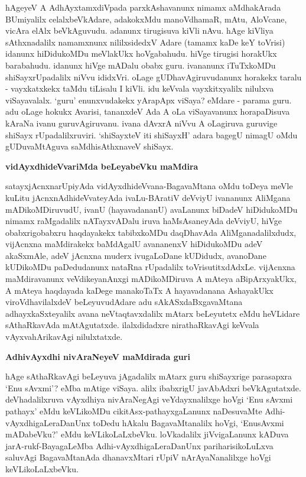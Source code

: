 hAgeyeV A AdhAyxtamxdiVpada parxkAshavanunx nimamx aMdhakArada BUmiyalilx celalxbeVkAdare, adakokxMdu manoVdhamaR, mAtu, AloVcane, vicAra elAlx beVkAguvudu. adanunx tirugisuva kiVli nAvu. hAge kiVliya sAthxnadalilx namamxnunx nililxsidedxV Adare (tamamx kaDe keY toVrisi) idanunx hiDidukoMDu meVlakUkx hoVgabahudu. hiVge tirugisi horakUkx barabahudu. idanunx hiVge mADalu obabx guru. ivananunx iTuTxkoMDu shiSayxrUpadalilx niVvu ididxVri. oLage gUDhavAgiruvudanunx horakekx taralu - vayxkatxkekx taMdu tiLisalu I kiVli. idu keVvala vayxkitxyalilx nilulxva viSayavalalx. `guru' enunxvudakekx yArapApx viSaya? eMdare - parama guru. adu oLage hokukx Avarisi, tananxdeV Ada A oLa viSayavanunx horapaDisuva kAraNa ivanu guruvAgiruvanu. ivana dAvxrA niVvu A oLagiruva guruvige shiSayx rUpadalilxruviri. `shiSayxteV iti shiSayxH' adara bagegU nimagU oMdu gUDuvaMtAguva saMdhisAthxnaveV shiSayx.

\noindent
\textbf{vidAyxdhideVvariMda beLeyabeVku maMdira}

satayxjAcnxnarUpiyAda vidAyxdhideVvana-BagavaMtana oMdu toDeya meVle kuLitu jAcnxnAdhideVvateyAda ivaLu-BAratiV deVviyU ivananunx AliMgana mADikoMDiruvudU, ivanU (hayavadananU) avaLanunx biDadeV hiDidukoMDu nimamx raMgadalilx nATayxvADalu iruva haMsAsaneyAda deVviyU, hiVge obabxrigobabxru haqdayakekx tabibxkoMDu daqDhavAda AliMganadalilxdudx, vijAcnxna maMdirakekx baMdAgalU avananenxV hiDidukoMDu adeV akaSxmAle, adeV jAcnxna muderx ivugaLoDane kUDidudx, avanoDane kUDikoMDu paDedudanunx nataRna rUpadalilx toVrisutitxdAdxLe. vijAcnxna maMdiravanunx veVdikeyanAnxgi mADikoMDiruva A mAteya aBipArxyakUkx, A mAteya haqdayada kaDege manakoTaTx A hayavadanana AshayakUkx viroVdhavilalxdeV beLeyuvudAdare adu sAkASxdaBxgavaMtana adhayxkaSxteyalilx avana neVtaqtavxdalilx mAtarx beLeyutetx eMdu heVLidare sAthaRkavAda mAtAgutatxde. ilalxdidadxre nirathaRkavAgi keVvala vAyxvahArikavAgi nilulxtatxde.

\noindent
\textbf{AdhivAyxdhi nivAraNeyeV maMdirada guri}\label{page67}

hAge sAthaRkavAgi beLeyuva jAgadalilx mAtarx guru shiSayxrige parasapxra `Enu sAvxmi'? eMba mAtige viSaya. alilx ibabxrigU javAbAdxri beVkAgutatxde. deVhadalilxruva vAyxdhiya nivAraNegAgi veYdayxnalilxge hoVgi `Enu sAvxmi pathayx' eMdu keVLikoMDu cikitAsx-pathayxgaLanunx naDesuvaMte Adhi-vAyxdhigaLeraDanUnx toDedu hAkalu BagavaMtanalilx hoVgi, `EnusAvxmi mADabeVku?' eMdu keVLikoLaLxbeVku. loVkadalilx jiVvigaLanunx kADuva jarA-rukf-BayagaLeMba Adhi-vAyxdhigaLeraDanUnx pariharisikoLuLxva saluvAgi BagavaMtanAda dhanavxMtari rUpiV nArAyaNanalilxge hoVgi keVLikoLaLxbeVku.

